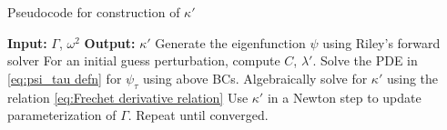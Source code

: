 \documentclass{article}
\begin{document}

    \begin{algorithm}
    \caption{Pseudocode for construction of $\kappa'$}
    \begin{algorithmic}[1] 
        \State \textbf{Input:} $\Gamma$, $\omega^2$
        \State \textbf{Output:} $\kappa'$
        \State Generate the eigenfunction $\psi$ using Riley's forward solver
        \State For an initial guess perturbation, compute $C$, $\lambda'$.
        \State Solve the PDE in \eqref{eq:psi_tau defn} for $\psi_\tau$ using above BCs.
        \State Algebraically solve for $\kappa'$ using the relation \eqref{eq:Frechet derivative relation}
        \State Use $\kappa'$ in a Newton step to update parameterization of $\Gamma$.
        \State Repeat until converged.
    \end{algorithmic}
    \end{algorithm}
    
\end{document}

